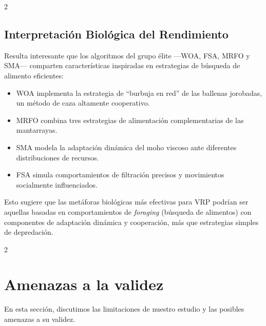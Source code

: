 \documentclass[10pt,a4paper]{extarticle}
\begin{document}
\begin{table}[!htbp]
\begin{multicols}{2}
\subsection{Interpretación Biológica del Rendimiento}
Resulta interesante que los algoritmos del grupo élite —WOA, FSA, MRFO y SMA— comparten características inspiradas en estrategias de búsqueda de alimento eficientes:
\begin{itemize}
\item WOA implementa la estrategia de ``burbuja en red'' de las ballenas jorobadas, un método de caza altamente cooperativo.
\item MRFO combina tres estrategias de alimentación complementarias de las mantarrayas.
\item SMA modela la adaptación dinámica del moho viscoso ante diferentes distribuciones de recursos.
\item FSA simula comportamientos de filtración precisos y movimientos socialmente influenciados.
\end{itemize}

Esto sugiere que las metáforas biológicas más efectivas para VRP podrían ser aquellas basadas en comportamientos de \textit{foraging} (búsqueda de alimentos) con componentes de adaptación dinámica y cooperación, más que estrategias simples de depredación.
\end{multicols}

\begin{multicols}{2}
\section{Amenazas a la validez}
En esta sección, discutimos las limitaciones de nuestro estudio y las posibles amenazas a su validez.


\end{multicols}
\end{table}
\end{document}
